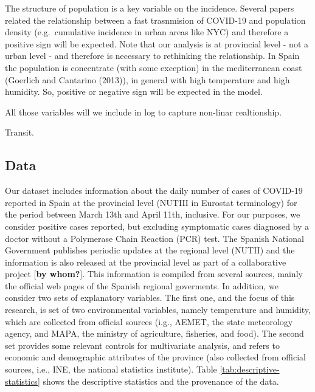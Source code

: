 \documentclass[]{elsarticle} %
\begin{document}
The structure of population is a key variable on the incidence. Several
papers related the relationship between a fast trasnmision of COVID-19
and population density (e.g.~cumulative incidence in urban areas like
NYC) and therefore a positive sign will be expected. Note that our
analysis is at provincial level - not a urban level - and therefore is
necessary to rethinking the relationship. In Spain the population is
concentrate (with some exception) in the mediterranean coast (Goerlich
and Cantarino (2013)), in general with high temperature and high
humidity. So, positive or negative sign will be expected in the model.

All those variables will we include in log to capture non-linar
realtionship.

Transit.

\hypertarget{data}{%
\subsection{Data}\label{data}}

Our dataset includes information about the daily number of cases of
COVID-19 reported in Spain at the provincial level (NUTIII in Eurostat
terminology) for the period between March 13th and April 11th,
inclusive. For our purposes, we consider positive cases reported, but
excluding symptomatic cases diagnosed by a doctor without a Polymerase
Chain Reaction (PCR) test. The Spanish National Government publishes
periodic updates at the regional level (NUTII) and the information is
also released at the provincial level as part of a collaborative project
{[}\textbf{by whom?}{]}. This information is compiled from several
sources, mainly the official web pages of the Spanish regional
goverments. In addition, we consider two sets of explanatory variables.
The first one, and the focus of this research, is set of two
environmental variables, namely temperature and humidity, which are
collected from official sources (i.g., AEMET, the state meteorology
agency, and MAPA, the ministry of agriculture, fisheries, and food). The
second set provides some relevant controls for multivariate analysis,
and refers to economic and demographic attributes of the province (also
collected from official sources, i.e., INE, the national statistics
institute). Table \ref{tab:descriptive-statistics} shows the descriptive
statistics and the provenance of the data.
\end{document}
